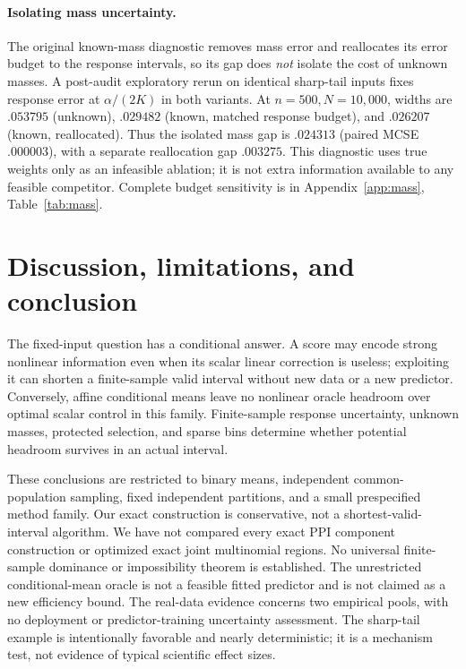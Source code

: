 \documentclass{article}
\begin{document}
\paragraph{Isolating mass uncertainty.}
The original known-mass diagnostic removes mass error and reallocates its error budget to the response intervals, so its gap does \emph{not} isolate the cost of unknown masses. A post-audit exploratory rerun on identical sharp-tail inputs fixes response error at $\alpha/(2K)$ in both variants. At $n=500,N=10{,}000$, widths are $.053795$ (unknown), $.029482$ (known, matched response budget), and $.026207$ (known, reallocated). Thus the isolated mass gap is $.024313$ (paired MCSE $.000003$), with a separate reallocation gap $.003275$. This diagnostic uses true weights only as an infeasible ablation; it is not extra information available to any feasible competitor. Complete budget sensitivity is in Appendix~\ref{app:mass}, Table~\ref{tab:mass}.

\section{Discussion, limitations, and conclusion}\label{sec:discussion}
The fixed-input question has a conditional answer. A score may encode strong nonlinear information even when its scalar linear correction is useless; exploiting it can shorten a finite-sample valid interval without new data or a new predictor. Conversely, affine conditional means leave no nonlinear oracle headroom over optimal scalar control in this family. Finite-sample response uncertainty, unknown masses, protected selection, and sparse bins determine whether potential headroom survives in an actual interval.

These conclusions are restricted to binary means, independent common-population sampling, fixed independent partitions, and a small prespecified method family. Our exact construction is conservative, not a shortest-valid-interval algorithm. We have not compared every exact PPI component construction or optimized exact joint multinomial regions. No universal finite-sample dominance or impossibility theorem is established. The unrestricted conditional-mean oracle is not a feasible fitted predictor and is not claimed as a new efficiency bound. The real-data evidence concerns two empirical pools, with no deployment or predictor-training uncertainty assessment. The sharp-tail example is intentionally favorable and nearly deterministic; it is a mechanism test, not evidence of typical scientific effect sizes.
\end{document}
